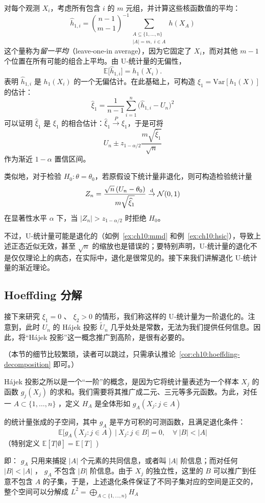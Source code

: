 对每个观测 $X_i$，考虑所有包含 $i$ 的 $m$ 元组，并计算这些核函数值的平均：
\[\widehat{h}_{1,i} = \binom{n-1}{m-1}^{-1} \sum_{\substack{A\subseteq\{1,\dots,n\}\\ |A|=m,\; i\in A}} h(X_A)\]
这个量称为\emph{留一平均}（leave‑one‑in average），因为它固定了 $X_i$，而对其他 $m-1$ 个位置在所有可能的组合上平均。由 U‑统计量的无偏性，
\[\mathbb{E}\bigl[\widehat{h}_{1,i}\bigr] = h_1(X_i).\]
表明 $\widehat{h}_{1,i}$ 是 $h_1(X_i)$ 的一个无偏估计。在此基础上，可构造 $\xi_1 = \mathrm{Var}[h_1(X)]$ 的估计：
\[\widehat{\xi}_1 = \frac{1}{n-1}\sum_{i=1}^n \bigl(\widehat{h}_{1,i} - U_n\bigr)^2\]
可以证明 $\widehat{\xi}_1$ 是 $\xi_1$ 的相合估计：$\widehat{\xi}_1 \overset P\to \xi_1$，于是可将
\[U_n \pm z_{1-\alpha/2}\frac{m\sqrt{\widehat{\xi}_1}}{\sqrt{n}}\]
作为渐近 $1-\alpha$ 置信区间。

类似地，对于检验 $H_0:\theta = \theta_0$，若原假设下统计量非退化，则可构造检验统计量
\[Z_n = \frac{\sqrt{n}\,(U_n - \theta_0)}{m\sqrt{\widehat{\xi}_1}} \overset{\rm d}\to\mathcal{N}(0,1)\]
在显著性水平 $\alpha$ 下，当 $|Z_n| > z_{1-\alpha/2}$ 时拒绝 $H_0$。

不过，U-统计量可能是退化的（如例~\ref{ex:ch10:mmd} 和例~\ref{ex:ch10:hsic}），导致上述正态近似无效，甚至 $\sqrt{n}$ 的缩放也是错误的；要特别声明，U-统计量的退化不是仅仅理论上的病态，在实际中，退化是很常见的。接下来我们讲解退化 U-统计量的渐近理论。

\subsection{Hoeffding 分解}

接下来研究 $\xi_1=0$ 、 $\xi_2>0$ 的情形，我们称这样的 U‑统计量为一阶退化的。注意到，此时 $U_n$ 的 Hájek 投影 $\widetilde U_n$ 几乎处处是常数，无法为我们提供任何信息。因此，将``Hájek 投影''这一概念推广到高阶，是很有必要的。

（本节的细节比较繁琐，读者可以跳过，只需承认推论~\ref{cor:ch10:hoeffding-decomposition} 即可。）

Hájek 投影之所以是一个``一阶''的概念，是因为它将统计量表述为一个样本 $X_j$ 的函数 $g_j(X_j)$ 的求和。我们需要将其推广成二元、三元等多元函数。为此，对任一 $A\subset\{1,\dots,n\}$ ，定义 $H_A$ 是全体形如 $g_A(X_j:j\in A)$

的统计量张成的子空间，其中 $g_A$ 是平方可积的可测函数，且满足退化条件：
\[\mathbb E\big[g_A(X_j:j\in A)\ \big|\ X_j:j\in B\big]=0,\quad \forall\ |B|<|A|\]
（特别定义 $\mathbb E[T|\emptyset]=\mathbb E[T]$ )

即： $g_A$ 只用来捕捉 $|A|$ 个元素的共同信息，或者叫 $|A|$ 阶信息；而对任何 $|B|<|A|$ ， $g_A$ 不包含 $|B|$ 阶信息。由于 $X_j$ 的独立性，这里的 $B$ 可以推广到任意不包含 $A$ 的子集，于是，上述退化条件保证了不同子集对应的空间是正交的，整个空间可以分解成 $L^2=\bigoplus_{A\subset \{1,\dots,n\}}H_A$

